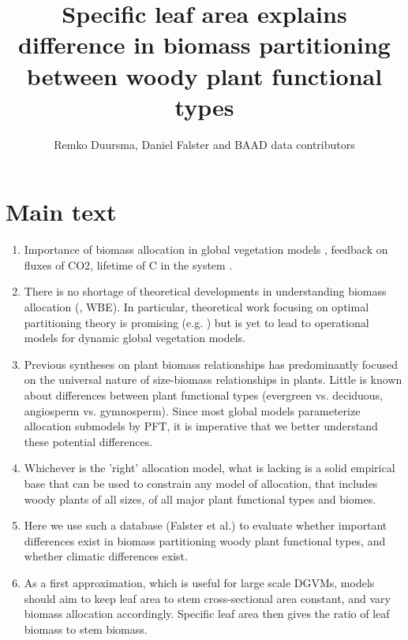 \documentclass[a4paper]{article}
\begin{document}
\title{Specific leaf area explains difference in biomass partitioning between woody plant functional types}

\author{Remko Duursma, Daniel Falster and BAAD data contributors}

\maketitle



\section{Main text}

\begin{enumerate}
\item Importance of biomass allocation in global vegetation models \cite{ise_comparison_2010}, feedback on fluxes of CO2, lifetime of C in the system \cite{friend_carbon_2014}.
  
\item There is no shortage of theoretical developments in understanding biomass allocation (\cite{cannell_carbon_1994,franklin_modeling_2012}, WBE). In particular, theoretical work focusing on optimal partitioning theory is promising (e.g. \cite{valentine_modeling_2012}) but is yet to lead to operational models for dynamic global vegetation models.
  
\item Previous syntheses on plant biomass relationships has predominantly focused on the universal nature of size-biomass relationships in plants. Little is known about differences between plant functional types (evergreen vs. deciduous, angiosperm vs. gymnosperm). Since most global models parameterize allocation submodels by PFT, it is imperative that we better understand these potential differences.
  
  
\item Whichever is the 'right' allocation model, what is lacking is a solid empirical base that can be used to constrain any model of allocation, that includes woody plants of all sizes, of all major plant functional types and biomes.
  
\item Here we use such a database (Falster et al.) to evaluate whether important differences exist in biomass partitioning woody plant functional types, and whether climatic differences exist.
  
\item As a first approximation, which is useful for large scale DGVMs, models should aim to keep leaf area to stem cross-sectional area constant, and vary biomass allocation accordingly. Specific leaf area then gives the ratio of leaf biomass to stem biomass. 


\end{enumerate}
\end{document}
